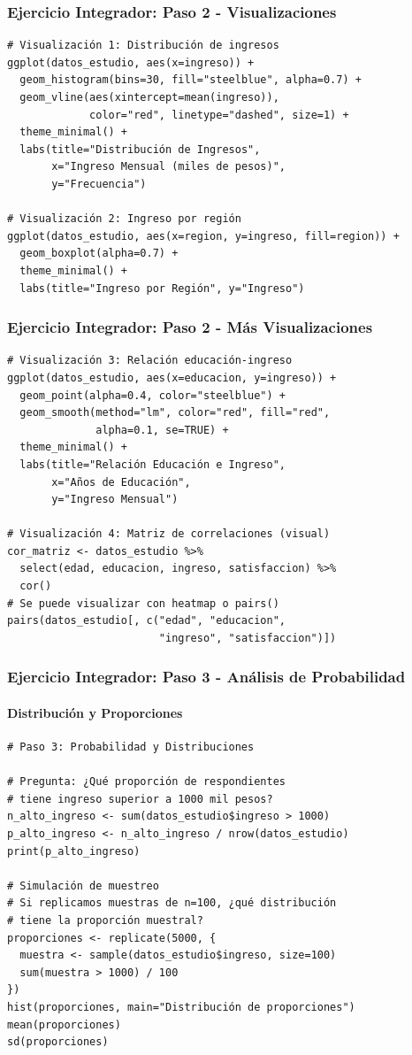\documentclass[aspectratio=169,11pt]{beamer}
\begin{document}
\begin{frame}[fragile]
\frametitle{Ejercicio Integrador: Paso 2 - Visualizaciones}
\begin{lstlisting}
# Visualización 1: Distribución de ingresos
ggplot(datos_estudio, aes(x=ingreso)) +
  geom_histogram(bins=30, fill="steelblue", alpha=0.7) +
  geom_vline(aes(xintercept=mean(ingreso)),
             color="red", linetype="dashed", size=1) +
  theme_minimal() +
  labs(title="Distribución de Ingresos",
       x="Ingreso Mensual (miles de pesos)",
       y="Frecuencia")

# Visualización 2: Ingreso por región
ggplot(datos_estudio, aes(x=region, y=ingreso, fill=region)) +
  geom_boxplot(alpha=0.7) +
  theme_minimal() +
  labs(title="Ingreso por Región", y="Ingreso")
\end{lstlisting}
\end{frame}

\begin{frame}[fragile]
\frametitle{Ejercicio Integrador: Paso 2 - Más Visualizaciones}
\begin{lstlisting}
# Visualización 3: Relación educación-ingreso
ggplot(datos_estudio, aes(x=educacion, y=ingreso)) +
  geom_point(alpha=0.4, color="steelblue") +
  geom_smooth(method="lm", color="red", fill="red",
              alpha=0.1, se=TRUE) +
  theme_minimal() +
  labs(title="Relación Educación e Ingreso",
       x="Años de Educación",
       y="Ingreso Mensual")

# Visualización 4: Matriz de correlaciones (visual)
cor_matriz <- datos_estudio %>%
  select(edad, educacion, ingreso, satisfaccion) %>%
  cor()
# Se puede visualizar con heatmap o pairs()
pairs(datos_estudio[, c("edad", "educacion",
                        "ingreso", "satisfaccion")])
\end{lstlisting}
\end{frame}

\begin{frame}[fragile]
\frametitle{Ejercicio Integrador: Paso 3 - Análisis de Probabilidad}
\framesubtitle{Distribución y Proporciones}
\begin{lstlisting}
# Paso 3: Probabilidad y Distribuciones

# Pregunta: ¿Qué proporción de respondientes
# tiene ingreso superior a 1000 mil pesos?
n_alto_ingreso <- sum(datos_estudio$ingreso > 1000)
p_alto_ingreso <- n_alto_ingreso / nrow(datos_estudio)
print(p_alto_ingreso)

# Simulación de muestreo
# Si replicamos muestras de n=100, ¿qué distribución
# tiene la proporción muestral?
proporciones <- replicate(5000, {
  muestra <- sample(datos_estudio$ingreso, size=100)
  sum(muestra > 1000) / 100
})
hist(proporciones, main="Distribución de proporciones")
mean(proporciones)
sd(proporciones)
\end{lstlisting}
\end{frame}
\end{document}
